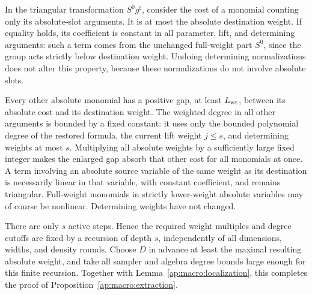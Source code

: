 In the triangular transformation $S^0g^\sharp$, consider the cost of
a monomial counting only its absolute-slot arguments.  It is at most
the absolute destination weight.  If equality holds, its coefficient
is constant in all parameter, lift, and determining arguments: such
a term comes from the unchanged full-weight part $S^0$, since the
group acts strictly below destination weight.  Undoing determining
normalizations does not alter this property, because these
normalizations do not involve absolute slots.

Every other absolute monomial has a positive gap, at least
$L_{\rm wt}$, between its absolute cost and its destination weight.
The weighted degree in all other arguments is bounded by a fixed
constant: it uses only the bounded polynomial degree of the restored
formula, the current lift weight $j\le s$, and determining weights
at most $s$.  Multiplying all absolute weights by a sufficiently
large fixed integer makes the enlarged gap absorb that other cost
for all monomials at once.  A term involving an absolute source
variable of the same weight as its destination is necessarily linear
in that variable, with constant coefficient, and remains triangular.
Full-weight monomials in strictly lower-weight absolute variables may
of course be nonlinear.  Determining weights have not changed.

There are only $s$ active steps.  Hence the required weight multiples
and degree cutoffs are fixed by a recursion of depth $s$, independently
of all dimensions, widths, and density rounds.  Choose $D$ in advance
at least the maximal resulting absolute weight, and take all sampler
and algebra degree bounds large enough for this finite recursion.
Together with Lemma~\ref{ap:macro:localization}, this completes the
proof of Proposition~\ref{ap:macro:extraction}.
